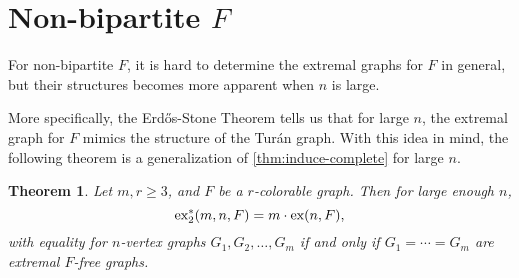 \documentclass[10pt, reqno]{report}
\newtheorem{theorem}{Theorem}[chapter]
\newtheorem{corollary}[theorem]{Corollary}
\newcommand*{\ex}{\textnormal{ex}}
\newcommand*{\dex}{\textnormal{ex}_2}
\begin{document}

\section{Non-bipartite $F$}

For non-bipartite $F$, it is hard to determine the extremal graphs for $F$ in general, but their structures becomes more apparent when $n$ is large. 

More specifically, the Erdős-Stone Theorem tells us that for large $n$, the extremal graph for $F$ mimics the structure of the Turán graph. With this idea in mind, the following theorem is a generalization of \cref{thm:induce-complete} for large $n$.

\begin{theorem}
  Let $m, r \geq 3$, and $F$ be a $r$-colorable graph. Then for large enough $n$, 
  \[
    \dex^*(m, n, F) = m \cdot \ex(n, F),
  \]
  with equality for $n$-vertex graphs $G_1, G_2, \ldots, G_m$ if and only if $G_1 = \cdots = G_m$ are extremal $F$-free graphs.
\end{theorem}
\end{document}
